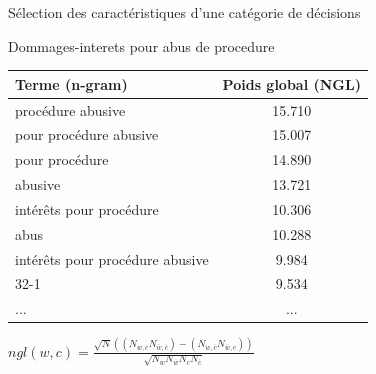 \documentclass[newPxFont,pagenumber]{beamer}
\renewcommand{\max}{\mathop{\mathrm{max}}\limits}
\begin{document}
\begin{frame}{Sélection des caractéristiques d'une catégorie de décisions}
\begin{exampleblock}{Dommages-interets pour abus de procedure}
\small
\begin{tabular}{l|c}
\textbf{Terme (n-gram)} & \textbf{Poids global (NGL)}  \\ \hline
\midrule
procédure abusive & 15.710 \\ \hline
pour procédure abusive & 15.007 \\ \hline
pour procédure & 14.890 \\ \hline
abusive & 13.721 \\ \hline
intérêts pour procédure & 10.306 \\ \hline
abus & 10.288 \\ \hline
intérêts pour procédure abusive & 9.984 \\ \hline
32-1 & 9.534\\ \hline
... & ...
\end{tabular}
\end{exampleblock}
$ngl(w,c) = \frac{\sqrt{N} ((N_{w,c} N_{\overline{w},\overline{c}}) - (N_{w,\overline{c}} N_{\overline{w},c}))}{\sqrt{N_w N_{\overline{w}} N_c N_{\overline{c}}}}$ %
\end{frame}

%
\end{document}
